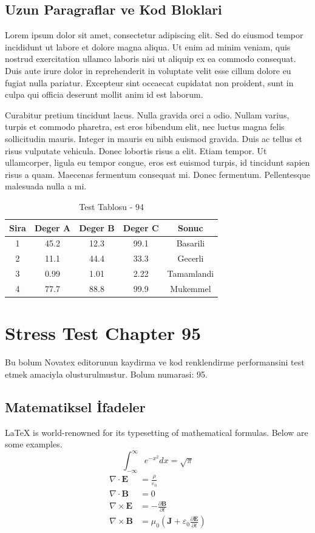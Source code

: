 \documentclass[12pt,a4paper]{article}
\begin{document}
\subsection{Uzun Paragraflar ve Kod Bloklari}
Lorem ipsum dolor sit amet, consectetur adipiscing elit. Sed do eiusmod tempor incididunt ut labore et dolore magna aliqua. Ut enim ad minim veniam, quis nostrud exercitation ullamco laboris nisi ut aliquip ex ea commodo consequat. Duis aute irure dolor in reprehenderit in voluptate velit esse cillum dolore eu fugiat nulla pariatur. Excepteur sint occaecat cupidatat non proident, sunt in culpa qui officia deserunt mollit anim id est laborum.

Curabitur pretium tincidunt lacus. Nulla gravida orci a odio. Nullam varius, turpis et commodo pharetra, est eros bibendum elit, nec luctus magna felis sollicitudin mauris. Integer in mauris eu nibh euismod gravida. Duis ac tellus et risus vulputate vehicula. Donec lobortis risus a elit. Etiam tempor. Ut ullamcorper, ligula eu tempor congue, eros est euismod turpis, id tincidunt sapien risus a quam. Maecenas fermentum consequat mi. Donec fermentum. Pellentesque malesuada nulla a mi.

\begin{table}[h!]
\centering
\begin{tabular}{|c|c|c|c|c|}
\hline
\textbf{Sira} & \textbf{Deger A} & \textbf{Deger B} & \textbf{Deger C} & \textbf{Sonuc} \\
\hline
1 & 45.2 & 12.3 & 99.1 & Basarili \\
2 & 11.1 & 44.4 & 33.3 & Gecerli \\
3 & 0.99 & 1.01 & 2.22 & Tamamlandi \\
4 & 77.7 & 88.8 & 99.9 & Mukemmel \\
\hline
\end{tabular}
\caption{Test Tablosu - 94}
\end{table}

\newpage
\section{Stress Test Chapter 95}
Bu bolum Novatex editorunun kaydirma ve kod renklendirme performansini test etmek amaciyla olusturulmustur. Bolum numarasi: 95.

\subsection{Matematiksel İfadeler}
\LaTeX{} is world-renowned for its typesetting of mathematical formulas. Below are some examples.
\begin{equation}
\int_{-\infty}^{\infty} e^{-x^2} dx = \sqrt{\pi}
\end{equation}
\begin{align}
\nabla \cdot \mathbf{E} &= \frac{\rho}{\varepsilon_0} \\
\nabla \cdot \mathbf{B} &= 0 \\
\nabla \times \mathbf{E} &= -\frac{\partial \mathbf{B}}{\partial t} \\
\nabla \times \mathbf{B} &= \mu_0\left(\mathbf{J} + \varepsilon_0 \frac{\partial \mathbf{E}}{\partial t}\right)
\end{align}
\end{document}
